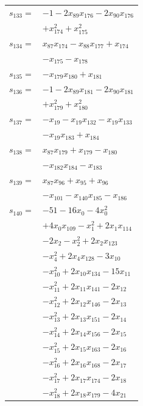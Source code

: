 \begin{longtable}{@{}r@{\;}l@{}}
\(s_{133}=\) & \(\displaystyle -1 -2x_{89}x_{176} -2x_{90}x_{176}\) \\
 & \(\displaystyle +x_{174}^{2} +x_{175}^{2}\) \\[3pt]
\(s_{134}=\) & \(\displaystyle x_{87}x_{174} -x_{88}x_{177} +x_{174}\) \\
 & \(\displaystyle -x_{175} -x_{178}\) \\[3pt]
\(s_{135}=\) & \(\displaystyle -x_{179}x_{180} +x_{181}\) \\[3pt]
\(s_{136}=\) & \(\displaystyle -1 -2x_{89}x_{181} -2x_{90}x_{181}\) \\
 & \(\displaystyle +x_{179}^{2} +x_{180}^{2}\) \\[3pt]
\(s_{137}=\) & \(\displaystyle -x_{19} -x_{19}x_{132} -x_{19}x_{133}\) \\
 & \(\displaystyle -x_{19}x_{183} +x_{184}\) \\[3pt]
\(s_{138}=\) & \(\displaystyle x_{87}x_{179} +x_{179} -x_{180}\) \\
 & \(\displaystyle -x_{182}x_{184} -x_{183}\) \\[3pt]
\(s_{139}=\) & \(\displaystyle x_{87}x_{96} +x_{95} +x_{96}\) \\
 & \(\displaystyle -x_{101} -x_{140}x_{185} -x_{186}\) \\[3pt]
\(s_{140}=\) & \(\displaystyle -51 -16x_{0} -4x_{0}^{2}\) \\
 & \(\displaystyle +4x_{0}x_{109} -x_{1}^{2} +2x_{1}x_{114}\) \\
 & \(\displaystyle -2x_{2} -x_{2}^{2} +2x_{2}x_{123}\) \\
 & \(\displaystyle -x_{4}^{2} +2x_{4}x_{128} -3x_{10}\) \\
 & \(\displaystyle -x_{10}^{2} +2x_{10}x_{134} -15x_{11}\) \\
 & \(\displaystyle -x_{11}^{2} +2x_{11}x_{141} -2x_{12}\) \\
 & \(\displaystyle -x_{12}^{2} +2x_{12}x_{146} -2x_{13}\) \\
 & \(\displaystyle -x_{13}^{2} +2x_{13}x_{151} -2x_{14}\) \\
 & \(\displaystyle -x_{14}^{2} +2x_{14}x_{156} -2x_{15}\) \\
 & \(\displaystyle -x_{15}^{2} +2x_{15}x_{163} -2x_{16}\) \\
 & \(\displaystyle -x_{16}^{2} +2x_{16}x_{168} -2x_{17}\) \\
 & \(\displaystyle -x_{17}^{2} +2x_{17}x_{174} -2x_{18}\) \\
 & \(\displaystyle -x_{18}^{2} +2x_{18}x_{179} -4x_{21}\) \\

\end{longtable}
